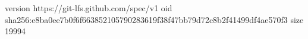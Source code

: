 version https://git-lfs.github.com/spec/v1
oid sha256:e8ba0ee7b0f6f663852105790283619f38f47bb79d72c8b2f41499df4ae570f3
size 19994
